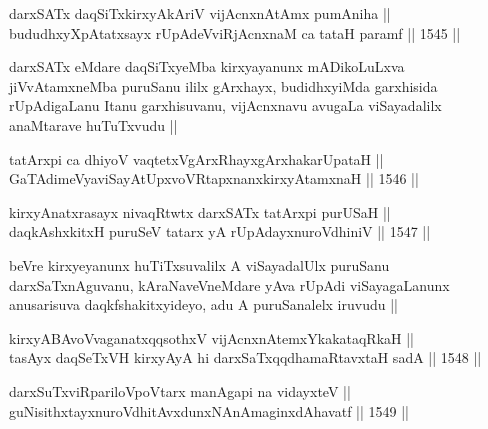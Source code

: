 
\begin{shl}
darxSATx daqSiTxkirxyAkAriV vijAcnxnAtAmx pumAniha || \\
bududhxyXpAtatxsayx rUpAdeVviRjAcnxnaM ca tataH paramf ||  1545 ||  
\end{shl}

\begin{artha}
darxSATx eMdare daqSiTxyeMba kirxyayanunx mADikoLuLxva jiVvAtamxneMba puruSanu ililx gArxhayx, budidhxyiMda garxhisida rUpAdigaLanu Itanu garxhisuvanu, vijAcnxnavu avugaLa viSayadalilx anaMtarave huTuTxvudu ||
\end{artha}

\begin{shl}
tatArxpi ca dhiyoV vaqtetxVgArxRhayxgArxhakarUpataH || \\
GaTAdimeVyaviSayAtUpxvoVRtapxnanxkirxyAtamxnaH ||  1546 ||  
\end{shl}



\begin{shl}
kirxyAnatxrasayx nivaqRtwtx darxSATx tatArxpi purUSaH || \\
daqkAshxkitxH puruSeV tatarx yA rUpAdayxnuroVdhiniV ||  1547 ||  
\end{shl}

\begin{artha}
beVre kirxyeyanunx huTiTxsuvalilx A viSayadalUlx puruSanu darxSaTxnAguvanu, kAraNaveVneMdare yAva rUpAdi viSayagaLanunx anusarisuva daqkfshakitxyideyo, adu A puruSanalelx iruvudu ||
\end{artha}



\begin{shl}
kirxyABAvoV\s vaganatxqqsothxV vijAcnxnAtemxYkakataqRkaH || \\
tasAyx daqSeTxVH kirxyAyA hi darxSaTxqqdhamaRtavxtaH sadA ||  1548 ||  
\end{shl}
				
\begin{shl}
darxSuTxviRpariloVpoV\s tarx manAgapi na vidayxteV || \\
guNisithxtayxnuroVdhitAvxdunxNAnAmaginxdAhavatf ||  1549 ||  
\end{shl}

